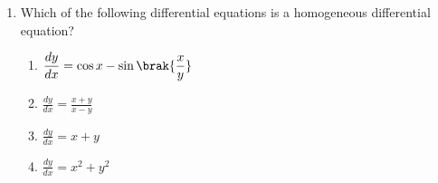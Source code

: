 \begin{enumerate}[label=\thesubsection.\arabic*, ref=\thesubsection.\theenumi]
\begin{enumerate}
\end{enumerate}

\solution
Given,
\begin{align}
I=\int_0^{\pi/2}
\frac{\sin x-\cos x}{1+\sin x\cos x}\,dx.
\end{align}
Using the substitution
\begin{align}
x=\frac{\pi}{2}-t,
\end{align}
we have
\begin{align}
dx=-dt.
\end{align}

When $x=0$, $t=\dfrac{\pi}{2}$.

When $x=\dfrac{\pi}{2}$, $t=0$.

Also,
\begin{align}
\sin x=\cos t,\qquad
\cos x=\sin t.
\end{align}

Therefore,
\begin{align}
I=\int_0^{\pi/2}
\frac{\cos t-\sin t}{1+\sin t\cos t}\,dt.
\end{align}

Rewriting the variable $t$ as $x$,
\begin{align}
I=\int_0^{\pi/2}
\frac{\cos x-\sin x}{1+\sin x\cos x}\,dx.
\end{align}
Comparing this with the original integral,
\begin{align}
I=-I.
\end{align}
Hence,
\begin{align}
2I=0
\end{align}
Therefore,
\begin{align}
I=0.
\end{align}

\item
Which of the following differential equations is a
homogeneous differential equation?

\begin{enumerate}
    \item $\displaystyle \frac{dy}{dx}=\cos x-\sin\brak{\frac{x}{y}}$
    \item $\displaystyle \frac{dy}{dx}=\frac{x+y}{x-y}$
    \item $\displaystyle \frac{dy}{dx}=x+y$
    \item $\displaystyle \frac{dy}{dx}=x^2+y^2$
\end{enumerate}


\end{enumerate}
